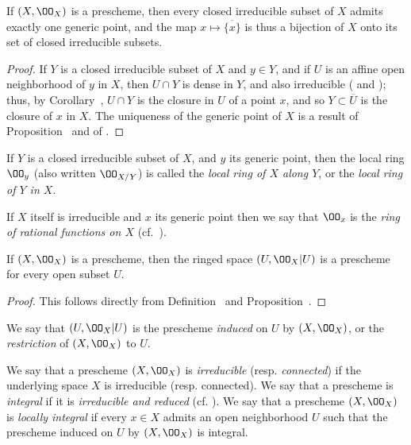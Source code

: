 \begin{prop}[2.1.5]
\label{1.2.1.5}
If $(X,\OO_X)$ is a prescheme, then every closed irreducible subset of $X$ admits exactly one generic point, and the map $x\mapsto\overline{\{x\}}$ is thus a bijection of $X$ onto its set of closed irreducible subsets.
\end{prop}

\begin{proof}
\label{proof-1.2.1.5}
If $Y$ is a closed irreducible subset of $X$ and $y\in Y$, and if $U$ is an affine open neighborhood of $y$ in $X$, then $U\cap Y$ is dense in $Y$, and also irreducible ( and );
thus, by Corollary~, $U\cap Y$ is the closure in $U$ of a point $x$, and so $Y\subset\overline{U}$ is the closure of $x$ in $X$.
The uniqueness of the generic point of $X$ is a result of Proposition~ and of .
\end{proof}

\begin{env}[2.1.6]
\label{1.2.1.6}
If $Y$ is a closed irreducible subset of $X$, and $y$ its generic point, then the local ring $\OO_y$ (also written $\OO_{X/Y}$) is called the \emph{local ring of $X$ along $Y$}, or the \emph{local ring of $Y$ in $X$}.

If $X$ itself is irreducible and $x$ its generic point then we say that $\OO_x$ is the \emph{ring of rational functions on $X$} (cf.~).
\end{env}

\begin{prop}[2.1.7]
\label{1.2.1.7}
If $(X,\OO_X)$ is a prescheme, then the ringed space $(U,\OO_X|U)$ is a prescheme for every open subset $U$.
\end{prop}

\begin{proof}
\label{proof-1.2.1.7}
This follows directly from Definition~ and Proposition~.
\end{proof}

We say that $(U,\OO_X|U)$ is the prescheme \emph{induced} on $U$ by $(X,\OO_X)$, or the \emph{restriction} of $(X,\OO_X)$ to $U$.

\begin{env}[2.1.8]
\label{1.2.1.8}
We say that a prescheme $(X,\OO_X)$ is \emph{irreducible} (resp. \emph{connected}) if the underlying space $X$ is irreducible (resp. connected).
We say that a prescheme is \emph{integral} if it is \emph{irreducible and reduced} (cf. ).
We say that a prescheme $(X,\OO_X)$ is \emph{locally integral} if every $x\in X$ admits an open neighborhood $U$ such that the prescheme induced on $U$ by $(X,\OO_X)$ is integral.
\end{env}

